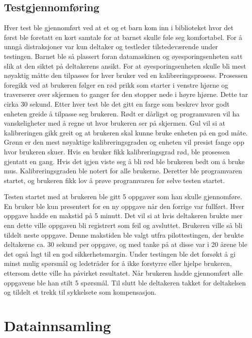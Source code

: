 \subsection{Testgjennomføring} 
Hver test ble gjennomført ved at et og et barn kom inn i biblioteket hvor det først ble foretatt en kort 
samtale for at barnet skulle føle seg komfortabel. For å unngå distraksjoner var kun deltaker og testleder 
tilstedeværende under testingen. Barnet ble så plassert foran datamaskinen og øyesporingsenheten satt slik at den siktet på deltakerens ansikt. For at øyesporingsenheten skulle bli mest nøyaktig måtte den tilpasses for hver bruker ved 
en kalibreringsprosess. Prosessen foregikk ved at brukeren følger en rød prikk som starter i 
venstre hjørne og traverserer over skjermen to ganger før den stopper nede i høyre hjørne. Dette 
tar cirka 30 sekund. Etter hver test ble det gitt en farge som beskrev hvor godt enheten greide å 
tilpasse seg brukeren. Rødt er dårligst og programvaren vil ha vanskeligheter med å regne ut hvor 
brukeren ser på skjermen. Gul vil si at kalibreringen gikk greit og at brukeren skal kunne bruke 
enheten på en god måte. Grønn er den mest nøyaktige kalibreringsgraden og enheten vil presist 
fange opp hvor brukeren skuer. Hvis en bruker fikk kalibreringsgrad rød, ble prosessen gjentatt en 
gang. Hvis det igjen viste seg å bli rød ble brukeren bedt om å bruke mus. Kalibreringsgraden ble 
notert for alle brukerne. Deretter ble programvaren startet, og brukeren fikk lov å prøve programvaren før selve testen startet. 
 
 
Testen startet med at brukeren ble  gitt 5 oppgaver som han skulle gjennomføre. En bruker ble kun presentert for en ny oppgave når den forrige var fullført. Hver oppgave hadde en makstid på 5 minutt. Det vil si at hvis deltakeren brukte mer enn dette ville oppgaven bli registrert som feil og avsluttet. Brukeren ville så bli tildelt neste oppgave. Denne makstiden ble valgt utfra pilottestingen, der brukte deltakerne ca. 30 sekund per oppgave, og med tanke på at disse var i 20 årene ble det også lagt til en god sikkerhetsmargin. Under testingen ble det forsøkt å gi minst mulig spørsmål og ledetråder for å ikke forstyrre eller hjelpe brukeren, ettersom dette ville ha påvirket resultatet. Når brukeren hadde gjennomført alle oppgavene ble han stilt 5 spørsmål. Til slutt ble deltakeren takket for deltakelsen og tildelt et trekk til sykkelsete som kompensasjon. 
 
 
\section{Datainnsamling} 
 
